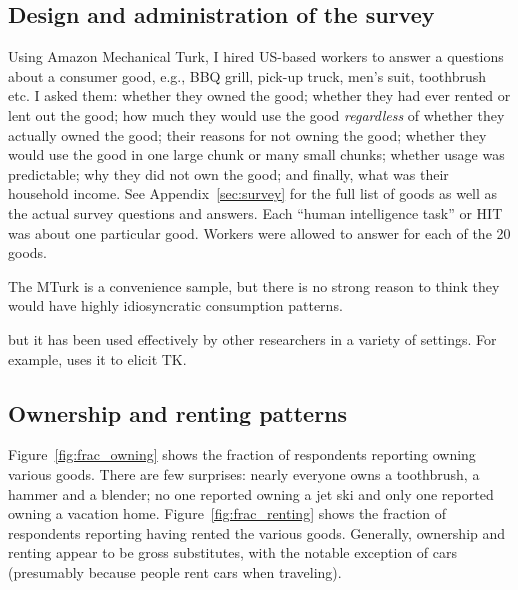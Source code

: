 \documentclass[11pt]{article}
\begin{document}
\subsection{Design and administration of the survey}

Using Amazon Mechanical Turk, I hired US-based workers to answer a questions about a consumer good, e.g., BBQ grill, pick-up truck, men's suit, toothbrush etc.
I asked them: whether they owned the good; whether they had ever rented or lent out the good; how much they would use the good \emph{regardless} of whether they actually owned the good; their reasons for not owning the good; whether they would use the good in one large chunk or many small chunks; whether usage was predictable; why they did not own the good; and finally, what was their household income. 
See Appendix~\ref{sec:survey} for the full list of goods as well as the actual survey questions and answers.  
Each ``human intelligence task'' or HIT was about one particular good. 
Workers were allowed to answer for each of the 20 goods.  

The MTurk is a convenience sample, but there is no strong reason to think they would have highly idiosyncratic consumption patterns. 

but it has been used effectively by other researchers in a variety of settings. 
For example, \cite{kuziemko2013elastic} uses it to elicit TK. 

\subsection{Ownership and renting patterns} 

Figure~\ref{fig:frac_owning} shows the fraction of respondents reporting owning various goods.  
There are few surprises: nearly everyone owns a toothbrush, a hammer and a blender; no one reported owning a jet ski and only one reported owning a vacation home.
Figure~\ref{fig:frac_renting} shows the fraction of respondents reporting having rented the various goods. 
Generally, ownership and renting appear to be gross substitutes, with the notable exception of cars (presumably because people rent cars when traveling). 
\end{document}
